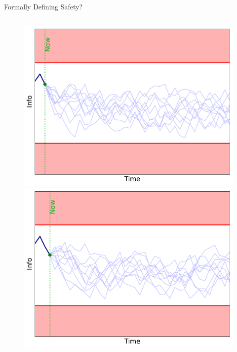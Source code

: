 \documentclass[lecture]{beamer}
\begin{document}
\begin{frame}{\normalsize Formally Defining Safety?}
\begin{columns}[t]
\begin{overlayarea}{\textwidth}{0.3\textheight}
\begin{figure}
{       \hspace{-1.5cm}             \includegraphics[width=\FS\textwidth]{Codes/BasicsSafety/Safe2.pdf}
        }%
        {%
       \hspace{-1.5cm}             \includegraphics[width=\FS\textwidth]{Codes/BasicsSafety/Safe3.pdf}
               }%
        {%
}
\end{figure}
\end{overlayarea}
\end{columns}
\end{frame}
\end{document}
